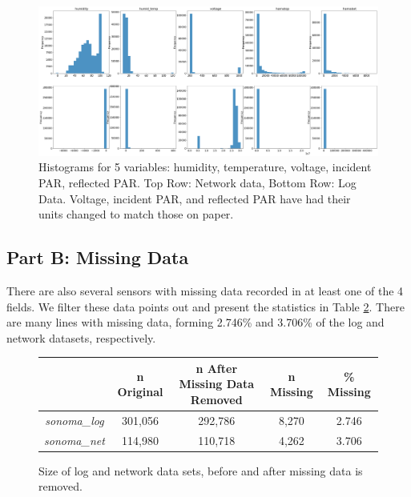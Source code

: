 \documentclass[11pt, letterpaper]{article}
\begin{document}
\begin{figure}[h!]
\centering
\includegraphics[width=1.0\textwidth]{Fig1.png}
\caption{Histograms for 5 variables: humidity, temperature, voltage, incident PAR, reflected PAR. Top Row: Network data, Bottom Row: Log Data. Voltage, incident PAR, and reflected PAR have had their units changed to match those on paper.}
\label{fig2:hist2}
\end{figure}


\subsection{Part B: Missing Data}
There are also several sensors with missing data recorded in at least one of the 4 fields. We filter these data points out and present the statistics in Table \ref{table:data_info}. There are many lines with missing data, forming 2.746\% and 3.706\% of the log and network datasets, respectively.

\begin{figure}[h!]
\centering
\begin{tabular}{ |c|c|c|c|c| } 
    \hline & n Original & n After Missing Data Removed & n Missing & \% Missing \\
    \hline
    \textit{sonoma\_log} & 301,056 & 292,786 & 8,270 &2.746\\ 
    \textit{sonoma\_net}  & 114,980 & 110,718 & 4,262 & 3.706\\
    \hline
\end{tabular}
\caption{Size of log and network data sets, before and after missing data is removed.}
\label{table:data_info}
\end{figure}
\end{document}
